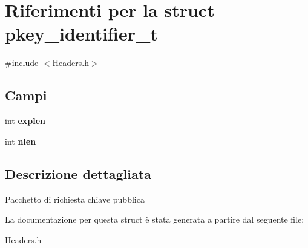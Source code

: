 \hypertarget{structpkey__identifier__t}{}\section{Riferimenti per la struct pkey\+\_\+identifier\+\_\+t}
\label{structpkey__identifier__t}


{\ttfamily \#include $<$Headers.\+h$>$}

\subsection*{Campi}
\begin{DoxyCompactItemize}
\item 
int {\bfseries explen}\hypertarget{structpkey__identifier__t_a7729b33138069bdc3beb5dd03bea2613}{}\label{structpkey__identifier__t_a7729b33138069bdc3beb5dd03bea2613}

\item 
int {\bfseries nlen}\hypertarget{structpkey__identifier__t_a61cdeeb9e3bebcdcdaf1a8cbb8eaf186}{}\label{structpkey__identifier__t_a61cdeeb9e3bebcdcdaf1a8cbb8eaf186}

\end{DoxyCompactItemize}


\subsection{Descrizione dettagliata}
Pacchetto di richiesta chiave pubblica 

La documentazione per questa struct è stata generata a partire dal seguente file\+:\begin{DoxyCompactItemize}
\item 
Headers.\+h\end{DoxyCompactItemize}
